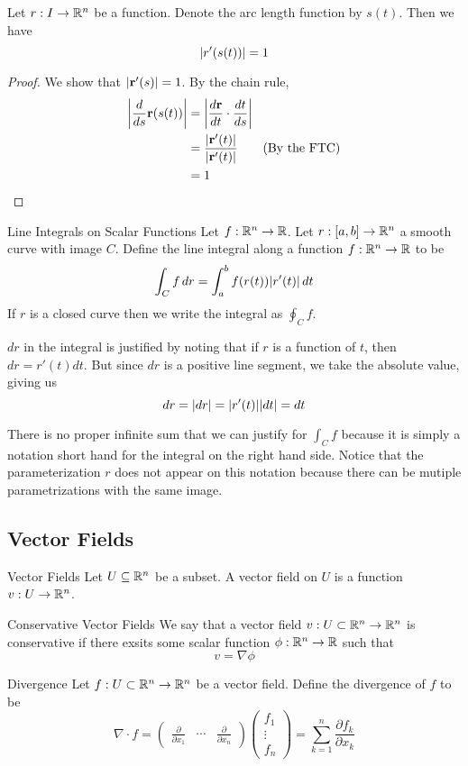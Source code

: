 \documentclass[a4paper]{article}
\begin{document}
\begin{lmm}{}{} Let $r:I\to\mathbb{R}^n$ be a function. Denote the arc length function by $s(t)$. Then we have $$\abs{r'(s(t))}=1$$ 
\begin{proof} We show that $\abs{\vb{r}'(s)}=1$. By the chain rule, 
\begin{align*}
\abs{\frac{d}{ds}\vb{r}(s(t))}&=\abs{\frac{d\vb{r}}{dt}\cdot\frac{dt}{ds}}\\
&=\frac{\abs{\vb{r}'(t)}}{\abs{\vb{r}'(t)}}\tag{By the FTC}\\
&=1
\end{align*}
\end{proof}
\end{lmm}

\begin{defn}{Line Integrals on Scalar Functions}{} Let $f:\mathbb{R}^n\to\mathbb{R}$. Let $r:[a,b]\to\mathbb{R}^n$ a smooth curve with image $C$. Define the line integral along a function $f:\mathbb{R}^n\to\mathbb{R}$ to be $$\int_Cf\,dr=\int_a^bf(r(t))\abs{r'(t)}\,dt$$ If $r$ is a closed curve then we write the integral as $\oint_Cf$. 
\end{defn}

$dr$ in the integral is justified by noting that if $r$ is a function of $t$, then $dr=r'(t)dt$. But since $dr$ is a positive line segment, we take the absolute value, giving us $$dr=\abs{dr}=\abs{r'(t)}\abs{dt}=dt$$

There is no proper infinite sum that we can justify for $\int_Cf$ because it is simply a notation short hand for the integral on the right hand side. Notice that the parameterization $r$ does not appear on this notation because there can be mutiple parametrizations with the same image. 

\subsection{Vector Fields}
\begin{defn}{Vector Fields}{} Let $U\subseteq\mathbb{R}^n$ be a subset. A vector field on $U$ is a function $v:U\to\mathbb{R}^n$. 
\end{defn}

\begin{defn}{Conservative Vector Fields}{} We say that a vector field $v:U\subset\mathbb{R}^n\to\mathbb{R}^n$ is conservative if there exsits some scalar function $\phi:\mathbb{R}^n\to\mathbb{R}$ such that $$v=\nabla\phi$$
\end{defn}

\begin{defn}{Divergence}{} Let $f:U\subset\mathbb{R}^n\to\mathbb{R}^n$ be a vector field. Define the divergence of $f$ to be $$\nabla\cdot f=\begin{pmatrix}\frac{\partial}{\partial x_1} & \cdots & \frac{\partial}{\partial x_n}\end{pmatrix}\begin{pmatrix}f_1\\\vdots\\f_n\end{pmatrix}=\sum_{k=1}^n\frac{\partial f_k}{\partial x_k}$$
\end{defn}
\end{document}
